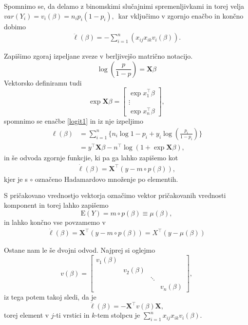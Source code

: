 \documentclass[12pt,a4paper]{amsart}
\theoremstyle{definition} %
\theoremstyle{plain} %
\begin{document}
Spomnimo se, da delamo z binomskimi slučajnimi spremenljivkami in torej velja $var(Y_{i}) = v_{i}(\beta) = n_{i}p_{i}(1-p_{i}),$~kar vključimo v zgornjo enačbo in končno dobimo
\begin{align}
    \ddot{\ell}(\beta) = -\sum_{i=1}^{n}\left(x_{ij}x_{ik}v_{i}(\beta)\right).
\end{align}

Zapišimo zgoraj izpeljane zveze v berljivejšo matrično notacijo. 
\begin{equation*}
    \log \left(\frac{p}{1-p}\right) = \mathbf{X}\beta
\end{equation*}
Vektorsko definiramu tudi
\[
    \exp{\mathbf{X}\beta} = \begin{bmatrix}
                            \exp{x_{1}^\top\beta} \\
                            \vdots\\
                            \exp{x_{n}^\top\beta}

                            \end{bmatrix},
\]
spomnimo se enačbe \eqref{logit1} in iz nje izpeljimo
\begin{align} \label{ell}
    \ell(\beta) &= \sum_{i=1}^{n}\{n_{i}\log{1-p_{i}}  + y_{i}\log{\left(\frac{p_{i}}{1-p_{i}}\right)}\} \nonumber\\
    &= y^\top\mathbf{X}\beta - n^\top \log(1 + \exp{\mathbf{X}\beta}),
\end{align}
in še odvoda zgornje funkcjie, ki pa ga lahko zapišemo kot
\begin{align}
    \dot{\ell}(\beta) = \mathbf{X}^\top(y - m\circ p(\beta)),
\end{align}
kjer je s $\circ$ označeno Hadamardovo množenje po elementih.

S pričakovano vrednostjo vektorja označimo vektor pričakovanih vrednosti komponent in torej lahko zapišemo
\begin{equation}
    \mathrm{E}(Y) = m \circ p(\beta) \equiv \mu(\beta),
\end{equation}
in lahko končno vse povzamemo v
\begin{align}\label{prvi}
    \dot{\ell}(\beta) = \mathbf{X}^\top(y - m \circ p(\beta)) = X^\top(y - \mu(\beta))
\end{align}

Ostane nam le še dvojni odvod. Najprej si oglejmo
\[
    v(\beta) = \begin{bmatrix}
        v_{1}(\beta)  & & &\\
        & v_{2}(\beta) & & \\
        & & \ddots & \\
        & & & v_{n}(\beta)
    \end{bmatrix},
\]
iz tega potem takoj sledi, da je
\begin{equation} \label{drugi}
    \ddot{\ell}(\beta) = -\mathbf{X}^\top v(\beta)\mathbf{X},
\end{equation}
torej element v $j$-ti vrstici in $k$-tem stolpcu je $\sum_{i=1}^{n}x_{ij}x_{ik}v_{i}(\beta).$
\end{document}
